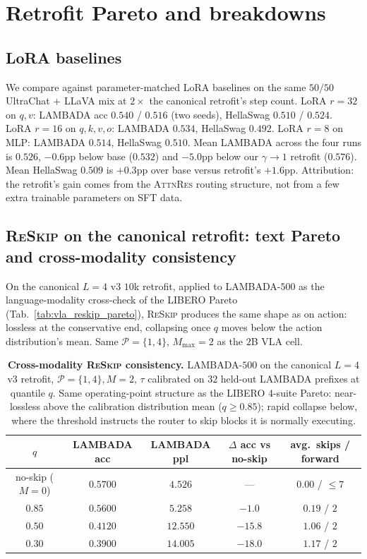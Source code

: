 \documentclass{article}
\newcommand{\attnres}{\textsc{AttnRes}}
\newcommand{\reskip}{\textsc{ReSkip}}
\begin{document}
\section{Retrofit Pareto and breakdowns}
\label{app:retrofit_extras}

\subsection{LoRA baselines}
\label{app:lora_baselines}
We compare against parameter-matched LoRA baselines on the same $50/50$ UltraChat $+$ LLaVA mix at $2{\times}$ the canonical retrofit's step count. LoRA $r{=}32$ on $q,v$: LAMBADA acc $0.540$ / $0.516$ (two seeds), HellaSwag $0.510$ / $0.524$. LoRA $r{=}16$ on $q,k,v,o$: LAMBADA $0.534$, HellaSwag $0.492$. LoRA $r{=}8$ on MLP: LAMBADA $0.514$, HellaSwag $0.510$. Mean LAMBADA across the four runs is $0.526$, $-0.6$pp below base ($0.532$) and $-5.0$pp below our $\gamma{\to}1$ retrofit ($0.576$). Mean HellaSwag $0.509$ is $+0.3$pp over base versus retrofit's $+1.6$pp. Attribution: the retrofit's gain comes from the \attnres{} routing structure, not from a few extra trainable parameters on SFT data.

\subsection{\reskip{} on the canonical retrofit: text Pareto and cross-modality consistency}
\label{app:retrofit_pareto}
On the canonical $L{=}4$ v3 $10$k retrofit, applied to LAMBADA-$500$ as the language-modality cross-check of the LIBERO Pareto (Tab.~\ref{tab:vla_reskip_pareto}), \reskip{} produces the same shape as on action: lossless at the conservative end, collapsing once $q$ moves below the action distribution's mean. Same $\mathcal{P}{=}\{1,4\}$, $M_{\max}{=}2$ as the $2$B VLA cell.

\begin{table}[h]
\caption{\textbf{Cross-modality \reskip{} consistency.} LAMBADA-$500$ on the canonical $L{=}4$ v3 retrofit, $\mathcal{P}{=}\{1,4\}, M{=}2$, $\tau$ calibrated on $32$ held-out LAMBADA prefixes at quantile $q$. Same operating-point structure as the LIBERO 4-suite Pareto: near-lossless above the calibration distribution mean ($q{\geq}0.85$); rapid collapse below, where the threshold instructs the router to skip blocks it is normally executing.}
\label{tab:retrofit_pareto}
\centering\small
\begin{tabular}{ccccc}
\toprule
$q$ & LAMBADA acc & LAMBADA ppl & $\Delta$ acc vs no-skip & avg.\ skips / forward \\
\midrule
no-skip ($M{=}0$) & $0.5700$ & $4.526$ & --- & $0.00$ / $\le 7$ \\
$0.85$ & $0.5600$ & $5.258$ & $-1.0$ & $0.19$ / $2$ \\
$0.50$ & $0.4120$ & $12.550$ & $-15.8$ & $1.06$ / $2$ \\
$0.30$ & $0.3900$ & $14.005$ & $-18.0$ & $1.17$ / $2$ \\
\bottomrule
\end{tabular}
\end{table}
\end{document}
